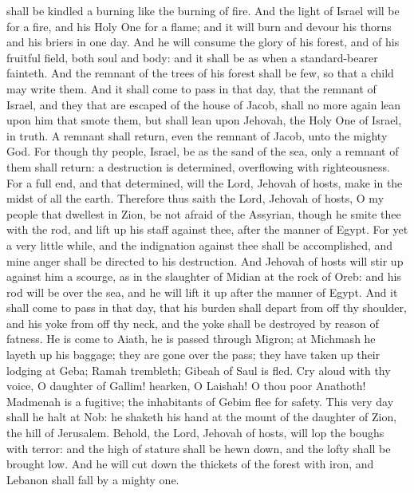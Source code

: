 shall be kindled a burning like the burning of fire. And the light of Israel will be for a fire, and his Holy One for a flame; and it will burn and devour his thorns and his briers in one day. And he will consume the glory of his forest, and of his fruitful field, both soul and body: and it shall be as when a standard-bearer fainteth. And the remnant of the trees of his forest shall be few, so that a child may write them.  And it shall come to pass in that day, that the remnant of Israel, and they that are escaped of the house of Jacob, shall no more again lean upon him that smote them, but shall lean upon Jehovah, the Holy One of Israel, in truth. A remnant shall return, even the remnant of Jacob, unto the mighty God. For though thy people, Israel, be as the sand of the sea, only a remnant of them shall return: a destruction is determined, overflowing with righteousness. For a full end, and that determined, will the Lord, Jehovah of hosts, make in the midst of all the earth.  Therefore thus saith the Lord, Jehovah of hosts, O my people that dwellest in Zion, be not afraid of the Assyrian, though he smite thee with the rod, and lift up his staff against thee, after the manner of Egypt. For yet a very little while, and the indignation against thee shall be accomplished, and mine anger shall be directed to his destruction. And Jehovah of hosts will stir up against him a scourge, as in the slaughter of Midian at the rock of Oreb: and his rod will be over the sea, and he will lift it up after the manner of Egypt. And it shall come to pass in that day, that his burden shall depart from off thy shoulder, and his yoke from off thy neck, and the yoke shall be destroyed by reason of fatness.  He is come to Aiath, he is passed through Migron; at Michmash he layeth up his baggage; they are gone over the pass; they have taken up their lodging at Geba; Ramah trembleth; Gibeah of Saul is fled. Cry aloud with thy voice, O daughter of Gallim! hearken, O Laishah! O thou poor Anathoth! Madmenah is a fugitive; the inhabitants of Gebim flee for safety. This very day shall he halt at Nob: he shaketh his hand at the mount of the daughter of Zion, the hill of Jerusalem.  Behold, the Lord, Jehovah of hosts, will lop the boughs with terror: and the high of stature shall be hewn down, and the lofty shall be brought low. And he will cut down the thickets of the forest with iron, and Lebanon shall fall by a mighty one. 


